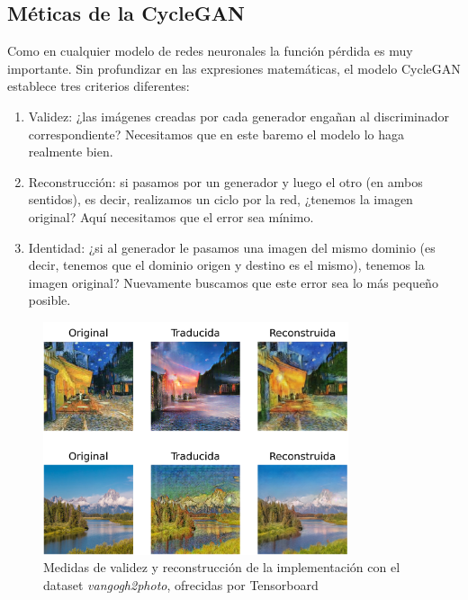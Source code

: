 \documentclass[../main.tex]{subfiles}
\begin{document}
\subsection{Méticas de la CycleGAN}

Como en cualquier modelo de redes neuronales la función pérdida es muy importante. Sin profundizar en las expresiones matemáticas, el modelo CycleGAN establece tres criterios diferentes:

\begin{enumerate}
    \item Validez: ¿las imágenes creadas por cada generador engañan al discriminador correspondiente? Necesitamos que en este baremo el modelo lo haga realmente bien.
    
    \item Reconstrucción: si pasamos por un generador y luego el otro (en ambos sentidos), es decir, realizamos un ciclo por la red, ¿tenemos la imagen original? Aquí necesitamos que el error sea mínimo.
    
    \item Identidad: ¿si al generador le pasamos una imagen del mismo dominio (es decir, tenemos que el dominio origen y destino es el mismo), tenemos la imagen original? Nuevamente buscamos que este error sea lo más pequeño posible.
\end{enumerate}

\begin{figure}[h]
    \centering
    \includegraphics[width=0.8\textwidth]{imagenes/ciclo medidas cyclegan tensorboard.png}
    \caption[Medidas de validez y reconstrucción]{Medidas de validez y reconstrucción de la implementación con el dataset \textit{vangogh2photo}, ofrecidas por Tensorboard}
    \label{fig:ciclo_imagen_tensorboard}
\end{figure}
\end{document}
